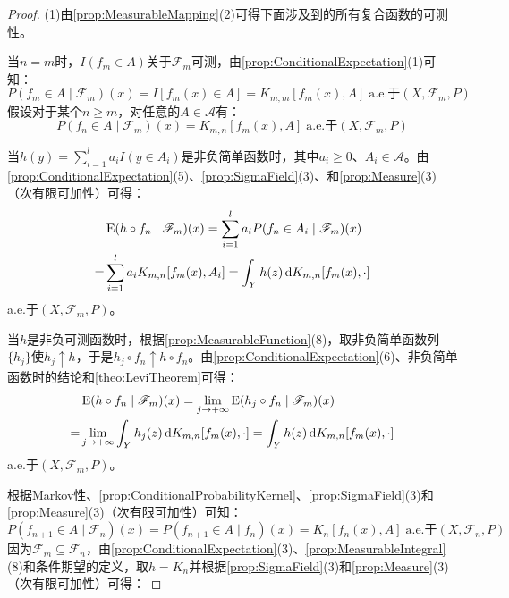\begin{proof}
	(1)由\cref{prop:MeasurableMapping}(2)可得下面涉及到的所有复合函数的可测性。\par
	当$n=m$时，$I(f_m\in A)$关于$\mathscr{F}_m$可测，由\cref{prop:ConditionalExpectation}(1)可知：
	\begin{equation*}
		P(f_m\in A\mid\mathscr{F}_m)(x)=I[f_m(x)\in A]=K_{m,m}[f_m(x),A]\;\text{a.e.于$(X,\mathscr{F}_m,P)$}
	\end{equation*}
	假设对于某个$n\geqslant m$，对任意的$A\in\mathscr{A}$有：
	\begin{equation*}
		P(f_n\in A\mid\mathscr{F}_m)(x)=K_{m,n}[f_m(x),A]\;\text{a.e.于$(X,\mathscr{F}_m,P)$}
	\end{equation*}\par
	当$h(y)=\sum\limits_{i=1}^{l}a_iI(y\in A_i)$是非负简单函数时，其中$a_i\geqslant0$、$A_i\in\mathscr{A}$。由\cref{prop:ConditionalExpectation}(5)、\cref{prop:SigmaField}(3)、和\cref{prop:Measure}(3)（次有限可加性）可得：
	\begin{align*}
		&\operatorname{E}(h\circ f_n\mid\mathscr{F}_m)(x)=\sum_{i=1}^{l}a_iP(f_n\in A_i\mid\mathscr{F}_m)(x) \\
		=&\sum_{i=1}^{l}a_iK_{m,n}[f_m(x),A_i]=\int_{Y}h(z)\mathop{}\!\mathrm{d} K_{m,n}[f_m(x),\cdot]
	\end{align*}
	a.e.于$(X,\mathscr{F}_m,P)$。\par
	当$h$是非负可测函数时，根据\cref{prop:MeasurableFunction}(8)，取非负简单函数列$\{h_j\}$使$h_j\uparrow h$，于是$h_j\circ f_n\uparrow h\circ f_n$。由\cref{prop:ConditionalExpectation}(6)、非负简单函数时的结论和\cref{theo:LeviTheorem}可得：
	\begin{align*}
		&\operatorname{E}(h\circ f_n\mid\mathscr{F}_m)(x)=\lim_{j\to+\infty}\operatorname{E}(h_j\circ f_n\mid\mathscr{F}_m)(x) \\
		=&\lim_{j\to+\infty}\int_{Y}h_j(z)\mathop{}\!\mathrm{d} K_{m,n}[f_m(x),\cdot]=\int_{Y}h(z)\mathop{}\!\mathrm{d} K_{m,n}[f_m(x),\cdot]
	\end{align*}
	a.e.于$(X,\mathscr{F}_m,P)$。\par
	根据Markov性、\cref{prop:ConditionalProbabilityKernel}、\cref{prop:SigmaField}(3)和\cref{prop:Measure}(3)（次有限可加性）可知：
	\begin{equation*}
		P(f_{n+1}\in A\mid\mathscr{F}_n)(x)=P(f_{n+1}\in A\mid f_n)(x)=K_n[f_n(x),A]\;\text{a.e.于$(X,\mathscr{F}_n,P)$}
	\end{equation*}
	因为$\mathscr{F}_m\subseteq\mathscr{F}_n$，由\cref{prop:ConditionalExpectation}(3)、\cref{prop:MeasurableIntegral}(8)和条件期望的定义，取$h=K_n$并根据\cref{prop:SigmaField}(3)和\cref{prop:Measure}(3)（次有限可加性）可得：

\end{proof}
